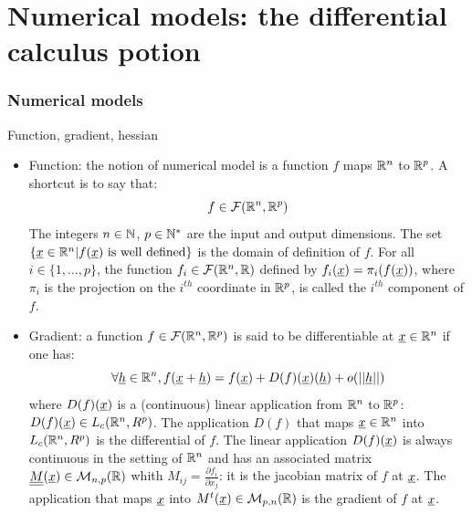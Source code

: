 \documentclass[8pt]{beamer}
\begin{document}
\section[Numerical models: the differential calculus potion]{Numerical models: the differential calculus potion}
\begin{frame}
  \frametitle{Numerical models}
  \begin{block}{Function, gradient, hessian}
    \begin{itemize}
    \item \alert{Function:} the notion of \alert{numerical model} is a function $f$ maps ${\mathbb R}^n$ to ${\mathbb R}^p$. A shortcut is to say that:
      \begin{equation}
        f\in\mathcal{F}({\mathbb R}^n,{\mathbb R}^p)
      \end{equation}
      The integers $n\in{\mathbb N}$, $p\in{\mathbb N}^{*}$ are the \alert{input} and \alert{output} dimensions. The set $\{{\underline{x}}\in{\mathbb R}^n|f({\underline{x}})\mbox{ is well defined}\}$ is the \alert{domain of definition} of $f$. For all $i\in\{1,\dots,p\}$, the function $f_i\in\mathcal{F}({\mathbb R}^n,{\mathbb R})$ defined by $f_i({\underline{x}})=\pi_i(f({\underline{x}}))$, where $\pi_i$ is the projection on the $i^{th}$ coordinate in ${\mathbb R}^p$, is called the \alert{$i^{th}$ component} of $f$.
    \item \alert{Gradient:} a function $f\in\mathcal{F}({\mathbb R}^n,{\mathbb R}^p)$ is said to be \alert{differentiable} at ${\underline{x}}\in{\mathbb R}^n$ if one has:
      \begin{equation}
        \forall{\underline{h}}\in{\mathbb R}^n, f({\underline{x}}+{\underline{h}})=f({\underline{x}})+D(f)({\underline{x}})({\underline{h}})+o(||{\underline{h}}||)
      \end{equation}
      where $D(f)({\underline{x}})$ is a (continuous) linear application from ${\mathbb R}^n$ to ${\mathbb R}^p$: $D(f)({\underline{x}})\in L_c({\mathbb R}^n,R^p)$. The application $D(f)$ that maps ${\underline{x}}\in{\mathbb R}^n$ into $L_c({\mathbb R}^n,R^p)$ is the \alert{differential} of $f$. The linear application $D(f)({\underline{x}})$ is always continuous in the setting of ${\mathbb R}^n$ and has an associated matrix ${\underline{\underline{M}}}({\underline{x}})\in\mathcal{M}_{n,p}({\mathbb R})$ whith $M_{ij}=\frac{\partial f_i}{\partial x_j}$: it is the \alert{jacobian matrix} of $f$ at ${\underline{x}}$. The application that maps ${\underline{x}}$ into $M^t({\underline{x}})\in\mathcal{M}_{p,n}({\mathbb R})$ is the \alert{gradient} of $f$ at ${\underline{x}}$.
    \end{itemize}
  \end{block}
\end{frame}
\end{document}
